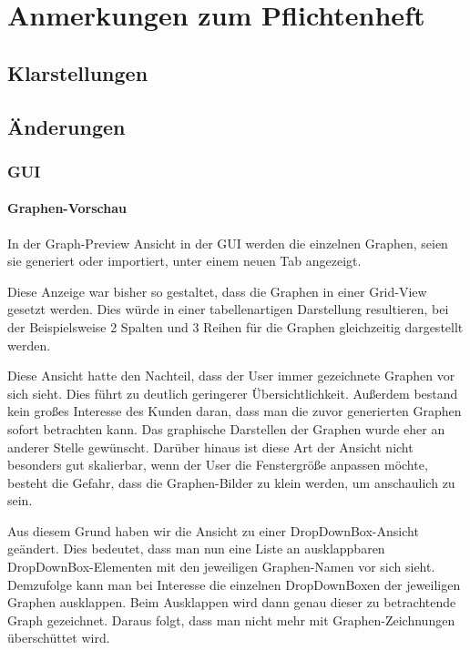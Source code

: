 \documentclass{article}
\begin{document}
	\section{Anmerkungen zum Pflichtenheft}
		\subsection{Klarstellungen}
		
		\subsection{Änderungen}
			\subsubsection{GUI}
			\paragraph{Graphen-Vorschau}
				In der Graph-Preview Ansicht in der GUI werden die einzelnen Graphen, seien sie generiert oder importiert, unter einem neuen Tab angezeigt.
				
				Diese Anzeige war bisher so gestaltet, dass die Graphen in einer Grid-View gesetzt werden.
				Dies würde in einer tabellenartigen Darstellung resultieren, bei der Beispielsweise 2 Spalten und 3 Reihen für die Graphen gleichzeitig dargestellt werden.
				
				Diese Ansicht hatte den Nachteil, dass der User immer gezeichnete Graphen vor sich sieht.
				Dies führt zu deutlich geringerer Übersichtlichkeit.
				Außerdem bestand kein großes Interesse des Kunden daran, dass man die zuvor generierten Graphen sofort betrachten kann.
					Das graphische Darstellen der Graphen wurde eher an anderer Stelle gewünscht.
				Darüber hinaus ist diese Art der Ansicht nicht besonders gut skalierbar, wenn der User die Fenstergröße anpassen möchte, besteht die Gefahr, dass die Graphen-Bilder zu klein werden, um anschaulich zu sein.
				
				Aus diesem Grund haben wir die Ansicht zu einer DropDownBox-Ansicht geändert.
				Dies bedeutet, dass man nun eine Liste an ausklappbaren DropDownBox-Elementen mit den jeweiligen Graphen-Namen vor sich sieht.
				Demzufolge kann man bei Interesse die einzelnen DropDownBoxen der jeweiligen Graphen ausklappen.
					Beim Ausklappen wird dann genau dieser zu betrachtende Graph gezeichnet.
					Daraus folgt, dass man nicht mehr mit Graphen-Zeichnungen überschüttet wird.
				
\end{document}
